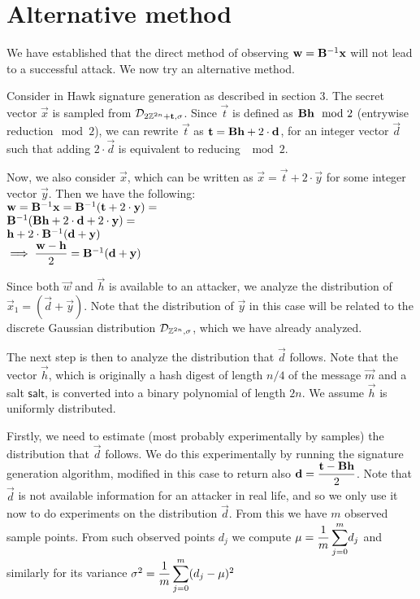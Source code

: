 \section{Alternative method}

We have established that the direct method of observing $\mathbf{w} = \mathbf{B}^{-1} \mathbf{x}$ will not lead to a successful attack.
We now try an alternative method.

Consider in Hawk signature generation as described in section 3.
The secret vector $\vec{x}$ is sampled from $\mathcal{D}_{2\mathbb{Z}^{2n} + \mathbf{t}, \sigma}$.
Since $\vec{t}$ is defined as $\mathbf{B}\mathbf{h}\mod 2$ (entrywise reduction$\mod 2$), we can rewrite $\vec{t}$ as $\mathbf{t} = \mathbf{B} \mathbf{h} + 2 \cdot \mathbf{d}$, 
for an integer vector $\vec{d}$ such that adding $2 \cdot \vec{d}$ is equivalent to reducing $\mod 2$.

Now, we also consider $\vec{x}$, which can be written as $\vec{x} = \vec{t} + 2 \cdot \vec{y}$ for some integer vector $\vec{y}$.
Then we have the following: \\ 
$\mathbf{w} = \mathbf{B}^{-1} \mathbf{x} = \mathbf{B}^{-1}(\mathbf{t} + 2 \cdot \mathbf{y}) =$ \\
$\mathbf{B}^{-1}(\mathbf{B} \mathbf{h} + 2 \cdot \mathbf{d} + 2 \cdot \mathbf{y}) =$ \\
$\mathbf{h} + 2\cdot \mathbf{B}^{-1}(\mathbf{d} + \mathbf{y}) $\\ 
$\implies \mathlarger{ \frac{\vec{w} - \vec{h}}{2}} = \mat{B}^{-1}(\vec{d} + \vec{y})$

Since both $\vec{w}$ and $\vec{h}$ is available to an attacker, we analyze the distribution of $\vec{x}_1 = (\vec{d} + \vec{y})$.
Note that the distribution of $\vec{y}$ in this case will be related to the discrete Gaussian distribution $\mathcal{D}_{\mathbb{Z}^{2n}, \sigma}$, which we have already analyzed.

The next step is then to analyze the distribution that $\vec{d}$ follows. Note that the vector $\vec{h}$, which is originally a hash digest of length $n / 4$ of the message $\vec{m}$ and a salt $\mathsf{salt}$, is converted into
a binary polynomial of length $2n$. We assume $\vec{h}$ is uniformly distributed.

Firstly, we need to estimate (most probably experimentally by samples) the distribution that $\vec{d}$ follows.
We do this experimentally by running the signature generation algorithm, modified in this case to return also $\vec{d} = \mathlarger{\frac{\vec{t}-\mat{B} \vec{h}}{2}}$.
Note that $\vec{d}$ is not available information for an attacker in real life, and so we only use it now to do experiments on the distribution $\vec{d}$.
From this we have $m$ observed sample points. From such observed points $d_j$ we compute 
$\mu = \mathlarger{\frac{1}{m} \sum_{j = 0}^{m}} d_j$ and similarly for its variance $\sigma^2 = \mathlarger{\frac{1}{m} \sum_{j = 0}^{m}} (d_j - \mu)^2$

